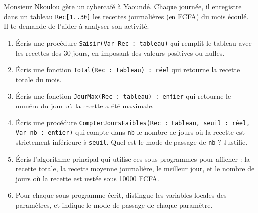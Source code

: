 \documentclass[11pt]{article}
\begin{document}
\begin{exercice}
Monsieur Nkoulou gère un cybercafé à Yaoundé. Chaque journée, il enregistre dans un tableau \texttt{Rec[1..30]} les recettes journalières (en FCFA) du mois écoulé. Il te demande de l'aider à analyser son activité.
\begin{enumerate}
  \item Écris une procédure \texttt{Saisir(Var Rec : tableau)} qui remplit le tableau avec les recettes des 30 jours, en imposant des valeurs positives ou nulles.
  \item Écris une fonction \texttt{Total(Rec : tableau) : réel} qui retourne la recette totale du mois.
  \item Écris une fonction \texttt{JourMax(Rec : tableau) : entier} qui retourne le numéro du jour où la recette a été maximale.
  \item Écris une procédure \texttt{CompterJoursFaibles(Rec : tableau, seuil : réel, Var nb : entier)} qui compte dans \texttt{nb} le nombre de jours où la recette est strictement inférieure à \texttt{seuil}. Quel est le mode de passage de \texttt{nb} ? Justifie.
  \item Écris l'algorithme principal qui utilise ces sous-programmes pour afficher : la recette totale, la recette moyenne journalière, le meilleur jour, et le nombre de jours où la recette est restée sous \num{10000} FCFA.
  \item Pour chaque sous-programme écrit, distingue les variables locales des paramètres, et indique le mode de passage de chaque paramètre.
\end{enumerate}
\end{exercice}
\end{document}
